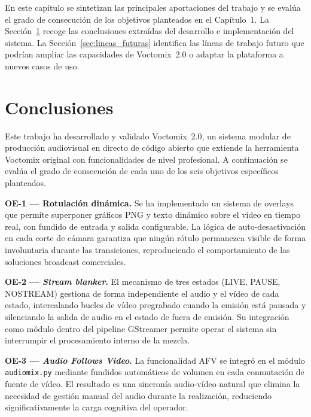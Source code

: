 En este capítulo se sintetizan las principales aportaciones del trabajo y se evalúa el
grado de consecución de los objetivos planteados en el Capítulo~1. La
Sección~\ref{sec:conclusiones} recoge las conclusiones extraídas del desarrollo e
implementación del sistema. La Sección~\ref{sec:lineas_futuras} identifica las líneas
de trabajo futuro que podrían ampliar las capacidades de Voctomix~2.0 o adaptar la
plataforma a nuevos casos de uso.

\section{Conclusiones}
\label{sec:conclusiones}

Este trabajo ha desarrollado y validado Voctomix~2.0, un sistema modular de producción
audiovisual en directo de código abierto que extiende la herramienta Voctomix original
con funcionalidades de nivel profesional. A continuación se evalúa el grado de
consecución de cada uno de los seis objetivos específicos planteados.

\vspace{0.3cm}
\noindent\textbf{OE-1 — Rotulación dinámica.}
Se ha implementado un sistema de overlays que permite superponer gráficos PNG y texto
dinámico sobre el vídeo en tiempo real, con fundido de entrada y salida configurable.
La lógica de auto-desactivación en cada corte de cámara garantiza que ningún rótulo
permanezca visible de forma involuntaria durante las transiciones, reproduciendo el
comportamiento de las soluciones broadcast comerciales.

\vspace{0.2cm}
\noindent\textbf{OE-2 — \textit{Stream blanker}.}
El mecanismo de tres estados (LIVE, PAUSE, NOSTREAM) gestiona de forma independiente
el audio y el vídeo de cada estado, intercalando bucles de vídeo pregrabado cuando la
emisión está pausada y silenciando la salida de audio en el estado de fuera de emisión.
Su integración como módulo dentro del pipeline GStreamer permite operar el sistema sin
interrumpir el procesamiento interno de la mezcla.

\vspace{0.2cm}
\noindent\textbf{OE-3 — \textit{Audio Follows Video}.}
La funcionalidad AFV se integró en el módulo \texttt{audiomix.py} mediante fundidos
automáticos de volumen en cada conmutación de fuente de vídeo. El resultado es una
sincronía audio-vídeo natural que elimina la necesidad de gestión manual del audio
durante la realización, reduciendo significativamente la carga cognitiva del operador.

